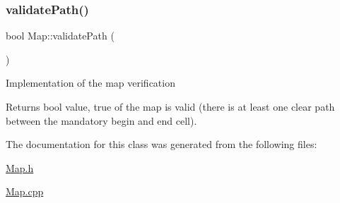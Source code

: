 \subsubsection{\texorpdfstring{validate\+Path()}{validatePath()}}
{\footnotesize\ttfamily bool Map\+::validate\+Path (\begin{DoxyParamCaption}{ }\end{DoxyParamCaption})}

Implementation of the map verification \begin{DoxyReturn}{Returns}
bool value, true of the map is valid (there is at least one clear path between the mandatory begin and end cell). 
\end{DoxyReturn}


The documentation for this class was generated from the following files\+:\begin{DoxyCompactItemize}
\item 
\hyperlink{Map_8h}{Map.\+h}\item 
\hyperlink{Map_8cpp}{Map.\+cpp}\end{DoxyCompactItemize}
